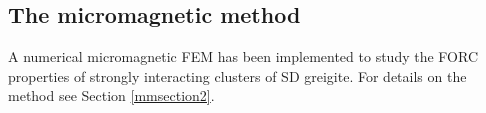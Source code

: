 \subsection{The micromagnetic method}
A numerical micromagnetic FEM \citep{OConbhui2017} has been implemented to study the FORC properties of strongly interacting clusters of SD greigite. For details on the method see Section \ref{mmsection2}.\par

